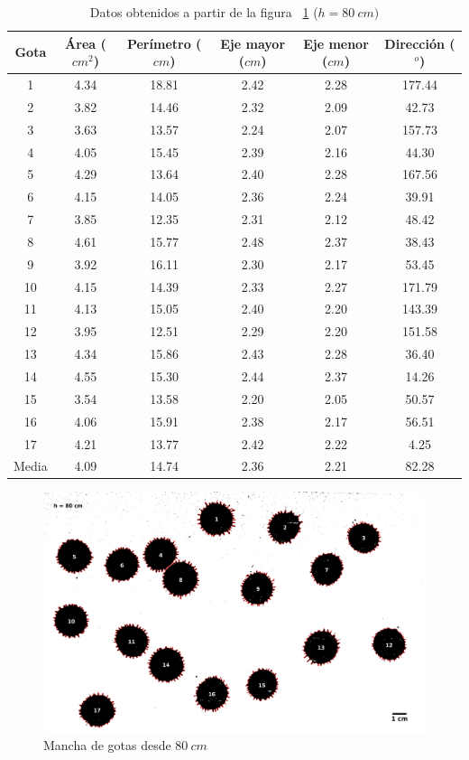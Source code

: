 \begin{table}[H] \centering \caption{Datos obtenidos a partir de la figura
    ~\ref{fig:80cm-1} ($h=80\ cm)$} \label{tab:80cm} \begin{tabular}{cccccc}
        \toprule Gota & Área ($cm^2$) & Perímetro ($cm$) & Eje mayor ($cm$) &
        Eje menor ($cm$) & Dirección ($^o$) \\ \midrule 1  & 4.34 & 18.81 &
        2.42 & 2.28 & 177.44 \\ 2  & 3.82 & 14.46 & 2.32 & 2.09 & 42.73  \\ 3
             & 3.63 & 13.57 & 2.24 & 2.07 & 157.73 \\ 4  & 4.05 & 15.45 & 2.39
             & 2.16 & 44.30  \\ 5  & 4.29 & 13.64 & 2.40 & 2.28 & 167.56 \\ 6
             & 4.15 & 14.05 & 2.36 & 2.24 & 39.91  \\ 7  & 3.85 & 12.35 & 2.31
             & 2.12 & 48.42  \\ 8  & 4.61 & 15.77 & 2.48 & 2.37 & 38.43  \\ 9
             & 3.92 & 16.11 & 2.30 & 2.17 & 53.45  \\ 10 & 4.15 & 14.39 & 2.33
             & 2.27 & 171.79 \\ 11 & 4.13 & 15.05 & 2.40 & 2.20 & 143.39 \\ 12
             & 3.95 & 12.51 & 2.29 & 2.20 & 151.58 \\ 13 & 4.34 & 15.86 & 2.43
             & 2.28 & 36.40  \\ 14 & 4.55 & 15.30 & 2.44 & 2.37 & 14.26  \\ 15
             & 3.54 & 13.58 & 2.20 & 2.05 & 50.57  \\ 16 & 4.06 & 15.91 & 2.38
             & 2.17 & 56.51  \\ 17 & 4.21 & 13.77 & 2.42 & 2.22 & 4.25   \\
        \midrule Media & 4.09 & 14.74 & 2.36 & 2.21 & 82.28 \\ \bottomrule
    \end{tabular} \end{table}

\begin{figure}[H] \centering
\includegraphics[width=0.85\linewidth]{src/80-1.png} \caption{Mancha de gotas
desde $80\ cm$} \label{fig:80cm-1} \end{figure}

